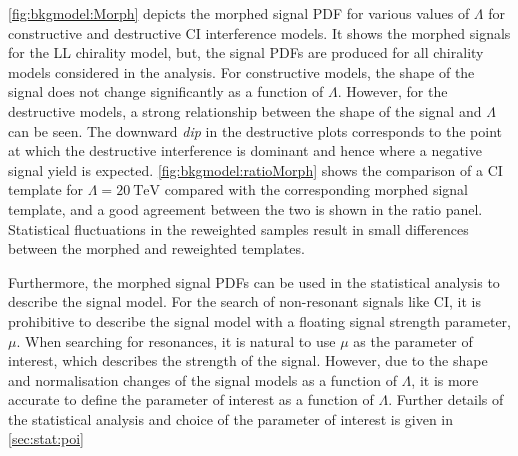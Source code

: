 \cref{fig:bkgmodel:Morph} depicts the morphed signal PDF for various values of $\Lambda$ for constructive and destructive CI interference models. It shows the morphed signals for the LL chirality model, but, the signal PDFs are produced for all chirality models considered in the analysis. For constructive models, the shape of the signal does not change significantly as a function of $\Lambda$. However, for the destructive models, a strong relationship between the shape of the signal and $\Lambda$ can be seen. The downward \emph{dip} in the destructive plots corresponds to the point at which the destructive interference is dominant and hence where a negative signal yield is expected. \cref{fig:bkgmodel:ratioMorph} shows the comparison of a CI template for $\Lambda = \SI{20}{\tera\electronvolt}$ compared with the corresponding morphed signal template, and a good agreement between the two is shown in the ratio panel. Statistical fluctuations in the reweighted samples result in small differences between the morphed and reweighted templates. 

Furthermore, the morphed signal PDFs can be used in the statistical analysis to describe the signal model. For the search of non-resonant signals like CI, it is prohibitive to describe the signal model with a floating signal strength parameter, $\mu$. When searching for resonances, it is natural to use $\mu$ as the parameter of interest, which describes the strength of the signal. However, due to the shape and normalisation changes of the signal models as a function of $\Lambda$, it is more accurate to define the parameter of interest as a function of $\Lambda$. Further details of the statistical analysis and choice of the parameter of interest is given in \cref{sec:stat:poi}


